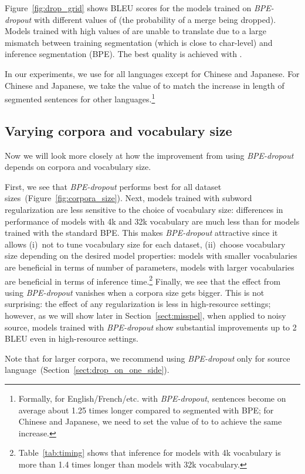\documentclass[11pt,a4paper]{article}
\begin{document}
Figure~\ref{fig:drop_grid} shows BLEU scores for the models trained on \textit{BPE-dropout} with different values of  (the probability of a merge being dropped). 
Models trained with high values of  are unable to translate due to a large mismatch between training segmentation (which is close to char-level) and inference segmentation (BPE). The best quality is achieved with . 

In our experiments, we use  for all languages except for Chinese and Japanese.
For Chinese and Japanese, we take the value of  to match the increase in length of segmented sentences for other languages.\footnote{Formally, for English/French/etc. with \textit{BPE-dropout},  sentences become on average about 1.25 times longer compared to segmented with BPE; for Chinese and Japanese, we need to set the value of  to  to achieve the same increase.}


\subsection{Varying corpora and vocabulary size}


Now we will look more closely at how the improvement from using \textit{BPE-dropout} depends on corpora and vocabulary size. 

First, we see that \textit{BPE-dropout} performs best for all dataset sizes~(Figure~\ref{fig:corpora_size}). Next, models trained with subword regularization are less sensitive to the choice of vocabulary size: differences in performance of models with 4k and 32k vocabulary are much less than for models trained with the standard BPE. This makes \textit{BPE-dropout} attractive since it allows (i)~not to tune vocabulary size for each dataset, (ii)~choose vocabulary size depending on the desired model properties: models with smaller vocabularies are beneficial in terms of number of parameters, models with larger vocabularies are beneficial in terms of inference time.\footnote{Table~\ref{tab:timing} shows that inference for models with 4k vocabulary is more than 1{.}4 times longer than models with 32k vocabulary.} Finally, we see that the effect from using \textit{BPE-dropout}  vanishes when a corpora size gets bigger. This is not surprising: the effect of any regularization is less in high-resource settings; however, as we will show later in Section~\ref{sect:misspel}, when applied to noisy source, models trained with \textit{BPE-dropout} show substantial improvements up to 2 BLEU even in high-resource settings. 

Note that for larger corpora, we recommend using \textit{BPE-dropout} only for source language~(Section~\ref{sect:drop_on_one_side}).
\end{document}
